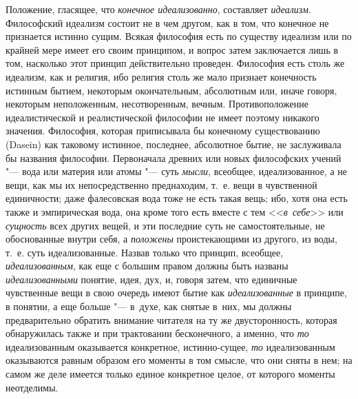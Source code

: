 Положение, гласящее, что {\em конечное идеализованно},
составляет {\em идеализм}. Философский идеализм состоит
не в чем другом, как в том, что конечное не признается истинно сущим.
Всякая философия есть по существу идеализм или по крайней мере имеет его
своим принципом, и вопрос затем заключается лишь в том, насколько этот
принцип действительно проведен. Философия есть столь же идеализм, как и
религия, ибо религия столь же мало признает конечность истинным бытием,
некоторым окончательным, абсолютным или, иначе говоря, некоторым
неположенным, несотворенным, вечным. Противоположение идеалистической и
реалистической философии не имеет поэтому никакого значения. Философия,
которая приписывала бы конечному существованию (Dasein) как таковому
истинное, последнее, абсолютное бытие, не заслуживала бы названия
философии. Первоначала древних или новых философских учений "--- вода или
материя или атомы "--- суть {\em мысли}, всеобщее,
идеализованное, а не вещи, как мы их непосредственно преднаходим, т.~е.
вещи в чувственной единичности; даже фалесовская вода тоже не есть такая
вещь; ибо, хотя она есть также и эмпирическая вода, она кроме того есть
вместе с тем <<{\em в~себе}>> или
{\em сущность} всех других вещей, и эти последние суть
не самостоятельные, не обоснованные внутри себя, а
{\em положены} проистекающими из другого, из
воды, т.~е. суть идеализованные. Назвав только что принцип, всеобщее,
{\em идеализованным}, как еще с большим правом должны
быть названы {\em идеализованными} понятие, идея, дух,
и, говоря затем, что единичные чувственные вещи в свою очередь имеют бытие
как {\em идеализованные} в принципе, в понятии, а еще
больше "--- в~духе, как снятые в~них, мы должны предварительно обратить
внимание читателя на ту же двусторонность, которая обнаружилась также и при
трактовании бесконечного, а именно, что {\em то}
идеализованным оказывается конкретное, истинно-сущее,
{\em то} идеализованным оказываются равным образом его
моменты в том смысле, что они сняты в нем; на самом же деле имеется только
единое конкретное целое, от которого моменты неотделимы.

